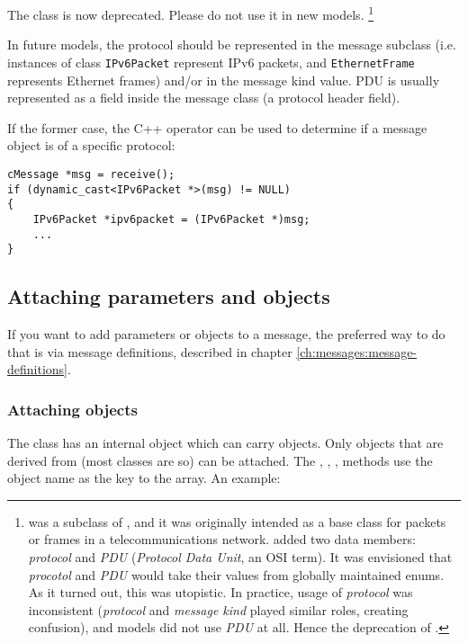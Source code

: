 The  class is now deprecated. Please do not use it
in new models.
  \footnote{ was a subclass of , and it
  was originally intended as a base class for packets or frames
  in a telecommunications network.  added two data members:
  \textit{protocol} and \textit{PDU} (\textit{Protocol Data Unit}, an OSI term).
  It was envisioned that \textit{procotol} and \textit{PDU} would take
  their values from globally maintained enums. As it turned out,
  this was utopistic. In practice, usage of \textit{protocol} was inconsistent
  (\textit{protocol} and \textit{message kind} played similar roles,
  creating confusion), and models did not use \textit{PDU} at all.
  Hence the deprecation of .}

In future {\opp} models, the protocol should be represented
in the message subclass (i.e. instances of class
\texttt{IPv6Packet} represent IPv6 packets,
and \texttt{EthernetFrame} represents Ethernet frames) and/or
in the message kind value. PDU is usually represented
as a field inside the message class (a protocol header field).

If the former case, the C++  operator can be used
to determine if a message object is of a specific protocol:

\begin{verbatim}
cMessage *msg = receive();
if (dynamic_cast<IPv6Packet *>(msg) != NULL)
{
    IPv6Packet *ipv6packet = (IPv6Packet *)msg;
    ...
}
\end{verbatim}




\subsection{Attaching parameters and objects}

If you want to add parameters or objects to a message, the preferred
way to do that is via message definitions, described in chapter
\ref{ch:messages:message-definitions}.

\subsubsection{Attaching objects}

The  class has an internal  object which can
carry objects. Only objects
that are derived from  (most {\opp} classes are so) can be attached.
The , , ,
 methods use the object name
as the key to the array. An example:

